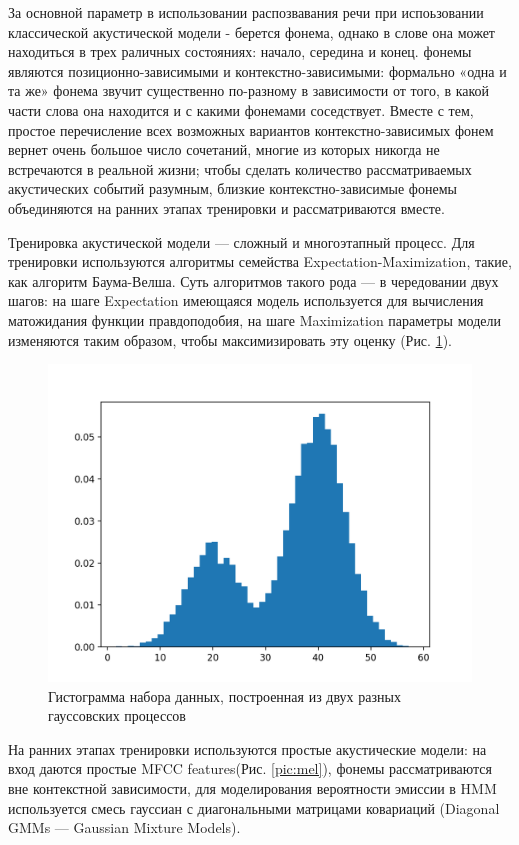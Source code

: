 За основной параметр в использовании распозвавания речи при испоьзовании классической акустической модели - 
берется фонема, однако в слове она может находиться в трех раличных состояниях: начало, середина и конец.
фонемы являются позиционно-зависимыми и контекстно-зависимыми: формально «одна и та же» фонема звучит существенно по-разному в зависимости от того, 
в какой части слова она находится и с какими фонемами соседствует. Вместе с тем, простое перечисление всех возможных вариантов контекстно-зависимых фонем 
вернет очень большое число сочетаний, многие из которых никогда не встречаются в реальной жизни; чтобы сделать количество рассматриваемых акустических событий разумным, 
близкие контекстно-зависимые фонемы объединяются на ранних этапах тренировки и рассматриваются вместе.

Тренировка акустической модели — сложный и многоэтапный процесс. Для тренировки используются алгоритмы семейства Expectation-Maximization, такие, как алгоритм Баума-Велша. 
Суть алгоритмов такого рода — в чередовании двух шагов: на шаге Expectation имеющаяся модель используется для вычисления матожидания функции правдоподобия, 
на шаге Maximization параметры модели изменяются таким образом, чтобы максимизировать эту оценку (Рис. \ref{pic:expect_max}). 

\begin{figure}[h]
\includegraphics[width=0.75\columnwidth]{./img/expect_max.png}
\centering
\caption{Гистограмма набора данных, построенная из двух разных гауссовских процессов}
\label{pic:expect_max}
\end{figure}

На ранних этапах тренировки используются простые акустические 
модели: на вход даются простые MFCC features(Рис. \ref{pic:mel}), фонемы рассматриваются вне контекстной зависимости, для моделирования вероятности эмиссии в HMM используется смесь 
гауссиан с диагональными матрицами ковариаций (Diagonal GMMs — Gaussian Mixture Models).

